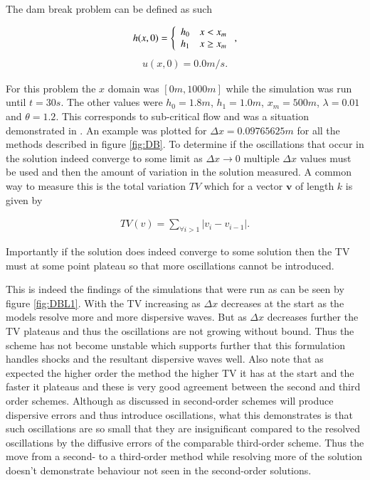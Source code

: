 \documentclass[SingleSpace,12pt]{Serre_ASCE}
\begin{document}
The dam break problem can be defined as such
\begin{linenomath*}
\begin{gather}
h(x,0) = \left\lbrace \begin{array}{c c}
h_0 & x < x_m\\
h_1 & x \ge x_m\\
\end{array} \right. ,
\end{gather}
\begin{gather}
u(x,0) = 0.0m/s.
\end{gather}
\end{linenomath*}
For this problem the $x$ domain was $\left[0m,1000m\right]$ while the simulation was run until $t=30s$. The other values were $h_0 = 1.8m$, $h_1 = 1.0m$, $x_m = 500m$, $\lambda = 0.01$ and $\theta = 1.2$. This corresponds to sub-critical flow and was a situation demonstrated in \cite{El-etal-2006,Hank-etal-2010-2034}. An example was plotted for $\Delta x = 0.09765625m$ for all the methods described in figure \ref{fig:DB}. To determine if the oscillations that occur in the solution indeed converge to some limit as $\Delta x \rightarrow 0$ multiple $\Delta x$ values must be used and then the amount of variation in the solution measured. A common way to measure this is the total variation $TV$ \cite{LeVeque-2002} which for a vector $\boldsymbol{v}$ of length $k$ is given by
\begin{linenomath*}
\begin{gather}
TV(v) = \sum_{\forall i >1} |v_{i} - v_{i-1}|.
\end{gather}
\end{linenomath*}
Importantly if the solution does indeed converge to some solution then the TV must at some point plateau so that more oscillations cannot be introduced.

This is indeed the findings of the simulations that were run as can be seen by figure \ref{fig:DBL1}. With the TV increasing as $\Delta x$ decreases at the start as the models resolve more and more dispersive waves. But as $\Delta x$ decreases further the TV plateaus and thus the oscillations are not growing without bound. Thus the scheme has not become unstable which supports further that this formulation handles shocks and the resultant dispersive waves well.  Also note that as expected the higher order the method the higher TV it has at the start and the faster it plateaus and these is very good agreement between the second and third order schemes. Although as discussed in \cite{Zoppou-Roberts-1996} second-order schemes will produce dispersive errors and thus introduce oscillations, what this demonstrates is that such oscillations are so small that they are insignificant compared to the resolved oscillations by the diffusive errors of the comparable third-order scheme. Thus the move from a second- to a third-order method while resolving more of the solution doesn't demonstrate behaviour not seen in the second-order solutions.
\end{document}
